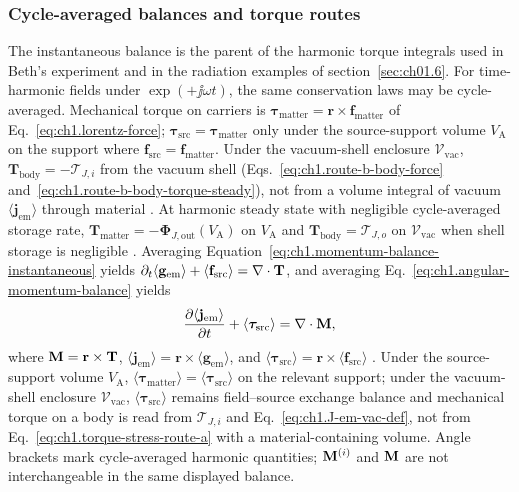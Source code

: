 \subsubsection*{Cycle-averaged balances and torque routes}

The instantaneous balance is the parent of the harmonic torque integrals used in Beth's experiment and in the radiation examples of section~\ref{sec:ch01.6}. For time-harmonic fields under $\exp(+\jj\omega t)$, the same conservation laws may be cycle-averaged. Mechanical torque on carriers is $\boldsymbol{\tau}_{\mathrm{matter}}=\mathbf{r}\times\mathbf{f}_{\mathrm{matter}}$ of Eq.~\eqref{eq:ch1.lorentz-force}; $\boldsymbol{\tau}_{\mathrm{src}}=\boldsymbol{\tau}_{\mathrm{matter}}$ only under the source-support volume $V_{\mathrm{A}}$ on the support where $\mathbf{f}_{\mathrm{src}}=\mathbf{f}_{\mathrm{matter}}$. Under the vacuum-shell enclosure $\mathcal{V}_{\mathrm{vac}}$, $\mathbf{T}_{\mathrm{body}}=-\boldsymbol{\mathcal{T}}_{J,i}$ from the vacuum shell (Eqs.~\eqref{eq:ch1.route-b-body-force} and~\eqref{eq:ch1.route-b-body-torque-steady}), not from a volume integral of vacuum $\langle\mathbf{j}_{\mathrm{em}}\rangle$ through material \cite{stratton1941,beth1936,harrington2001}. At harmonic steady state with negligible cycle-averaged storage rate, $\mathbf{T}_{\mathrm{matter}}=-\boldsymbol{\Phi}_{J,\mathrm{out}}(V_{\mathrm{A}})$ on $V_{\mathrm{A}}$ and $\mathbf{T}_{\mathrm{body}}=\boldsymbol{\mathcal{T}}_{J,o}$ on $\mathcal{V}_{\mathrm{vac}}$ when shell storage is negligible \cite{beth1936}. Averaging Equation~\eqref{eq:ch1.momentum-balance-instantaneous} yields $\partial_t\langle\mathbf{g}_{\mathrm{em}}\rangle+\langle\mathbf{f}_{\mathrm{src}}\rangle=\nabla\cdot\mathbf{T}$, and averaging Eq.~\eqref{eq:ch1.angular-momentum-balance} yields
\begin{equation}
\label{eq:ch1.angular-momentum-balance-averaged}
\frac{\partial\langle\mathbf{j}_{\mathrm{em}}\rangle}{\partial t}+\langle\boldsymbol{\tau}_{\mathrm{src}}\rangle
=\nabla\cdot\mathbf{M},
\end{equation}
where $\mathbf{M}=\mathbf{r}\times\mathbf{T}$, $\langle\mathbf{j}_{\mathrm{em}}\rangle=\mathbf{r}\times\langle\mathbf{g}_{\mathrm{em}}\rangle$, and $\langle\boldsymbol{\tau}_{\mathrm{src}}\rangle=\mathbf{r}\times\langle\mathbf{f}_{\mathrm{src}}\rangle$ \cite{stratton1941}. Under the source-support volume $V_{\mathrm{A}}$, $\langle\boldsymbol{\tau}_{\mathrm{matter}}\rangle=\langle\boldsymbol{\tau}_{\mathrm{src}}\rangle$ on the relevant support; under the vacuum-shell enclosure $\mathcal{V}_{\mathrm{vac}}$, $\langle\boldsymbol{\tau}_{\mathrm{src}}\rangle$ remains field--source exchange balance and mechanical torque on a body is read from $\boldsymbol{\mathcal{T}}_{J,i}$ and Eq.~\eqref{eq:ch1.J-em-vac-def}, not from Eq.~\eqref{eq:ch1.torque-stress-route-a} with a material-containing volume. Angle brackets mark cycle-averaged harmonic quantities; $\mathbf{M}^{(i)}$ and $\mathbf{M}$ are not interchangeable in the same displayed balance.

